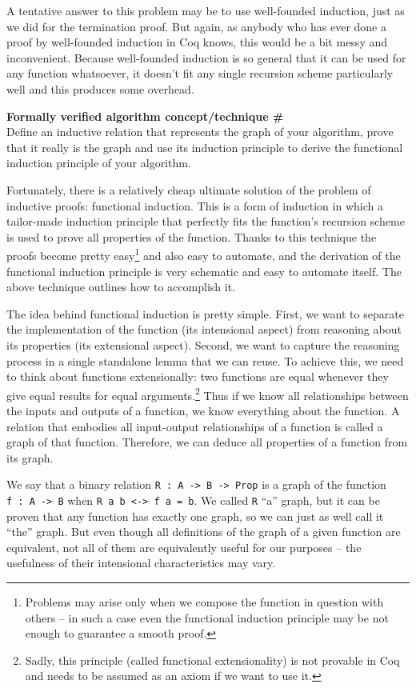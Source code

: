 \documentclass[declaration,mgr,english,shortabstract]{iithesis}
\newcommand{\m}[1]{\texttt{#1}}
\newcounter{cnt}
\newcommand{\runcnt}{\#\arabic{cnt}}
\newcommand{\concept}[1]
{
    \refstepcounter{cnt}
    \begin{center}
        \textbf{Formally verified algorithm concept/technique \runcnt} \\
        #1
    \end{center}
}
\begin{document}
A tentative answer to this problem may be to use well-founded induction, just as we did for the termination proof. But again, as anybody who has ever done a proof by well-founded induction in Coq knows, this would be a bit messy and inconvenient. Because well-founded induction is so general that it can be used for any function whatsoever, it doesn't fit any single recursion scheme particularly well and this produces some overhead.

\concept{Define an inductive relation that represents the graph of your algorithm, prove that it really is the graph and use its induction principle to derive the functional induction principle of your algorithm.}

Fortunately, there is a relatively cheap ultimate solution of the problem of inductive proofs: functional induction. This is a form of induction in which a tailor-made induction principle that perfectly fits the function's recursion scheme is used to prove all properties of the function. Thanks to this technique the proofs become pretty easy\footnote{Problems may arise only when we compose the function in question with others -- in such a case even the functional induction principle may be not enough to guarantee a smooth proof.} and also easy to automate, and the derivation of the functional induction principle is very schematic and easy to automate itself. The above technique outlines how to accomplish it.

The idea behind functional induction is pretty simple. First, we want to separate the implementation of the function (its intensional aspect) from reasoning about its properties (its extensional aspect). Second, we want to capture the reasoning process in a single standalone lemma that we can reuse. To achieve this, we need to think about functions extensionally: two functions are equal whenever they give equal results for equal arguments.\footnote{Sadly, this principle (called functional extensionality) is not provable in Coq and needs to be assumed as an axiom if we want to use it.} Thus if we know all relationships between the inputs and outputs of a function, we know everything about the function. A relation that embodies all input-output relationships of a function is called a graph of that function. Therefore, we can deduce all properties of a function from its graph.

We say that a binary relation \m{R\ :\ A -> B -> Prop} is a graph of the function \m{f\ :\ A -> B} when \m{R a b <-> f a = b}. We called \m{R} ``a'' graph, but it can be proven that any function has exactly one graph, so we can just as well call it ``the'' graph. But even though all definitions of the graph of a given function are equivalent, not all of them are equivalently useful for our purposes -- the usefulness of their intensional characteristics may vary.
\end{document}

